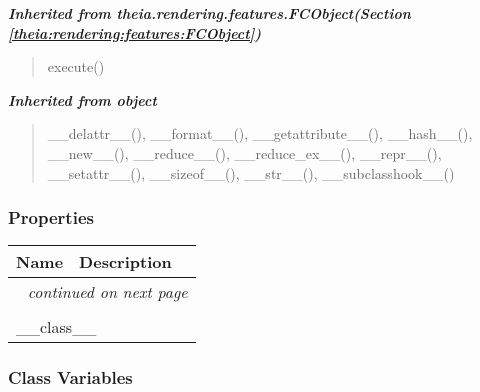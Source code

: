 \large{\textbf{\textit{Inherited from theia.rendering.features.FCObject\textit{(Section \ref{theia:rendering:features:FCObject})}}}}

\begin{quote}
execute()
\end{quote}

\large{\textbf{\textit{Inherited from object}}}

\begin{quote}
\_\_delattr\_\_(), \_\_format\_\_(), \_\_getattribute\_\_(), \_\_hash\_\_(), \_\_new\_\_(), \_\_reduce\_\_(), \_\_reduce\_ex\_\_(), \_\_repr\_\_(), \_\_setattr\_\_(), \_\_sizeof\_\_(), \_\_str\_\_(), \_\_subclasshook\_\_()
\end{quote}


  \subsubsection{Properties}

    \vspace{-1cm}
\hspace{\varindent}\begin{longtable}{|p{\varnamewidth}|p{\vardescrwidth}|l}
\cline{1-2}
\cline{1-2} \centering \textbf{Name} & \centering \textbf{Description}& \\
\cline{1-2}
\endhead\cline{1-2}\multicolumn{3}{r}{\small\textit{continued on next page}}\\\endfoot\cline{1-2}
\endlastfoot\multicolumn{2}{|l|}{\textit{Inherited from object}}\\
\multicolumn{2}{|p{\varwidth}|}{\raggedright \_\_class\_\_}\\
\cline{1-2}
\end{longtable}



  \subsubsection{Class Variables}

